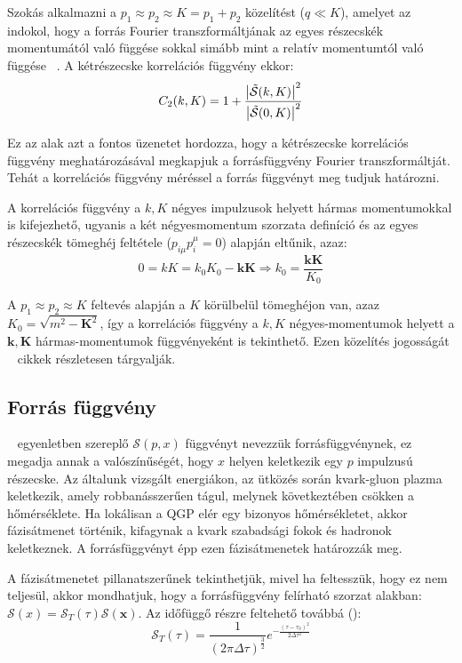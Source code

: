 \documentclass[11pt,a4paper]{article}
\numberwithin{equation}{subsection}
\numberwithin{figure}{section}
\begin{document}
Szokás alkalmazni a ${p_1}\approx {p_2}\approx {K} = p_1+p_2$ közelítést ($q\ll K$), amelyet az indokol, hogy a forrás Fourier transzformáltjának az egyes részecskék momentumától való függése sokkal simább mint a relatív momentumtól való függése ~\cite{Lisa:2005dd}. A kétrészecske korrelációs függvény ekkor: 
\begin{equation}
C_2({k}, {K})=1+\frac{\abs{\tilde{\mathcal{S}}({k},{K})}^2}{\abs{\tilde{\mathcal{S}}(0,{K})}^2}
\label{eq:C02}
\end{equation}

Ez az alak azt a fontos üzenetet hordozza, hogy a kétrészecske korrelációs függvény meghatározásával megkapjuk a forrásfüggvény Fourier transzformáltját. Tehát a korrelációs függvény méréssel a forrás függvényt meg tudjuk határozni. 


A korrelációs függvény a $k,K$ négyes impulzusok helyett hármas momentumokkal is kifejezhető, ugyanis a két négyesmomentum szorzata definíció és az egyes részecskék tömeghéj feltétele ($p_{i\mu}p^{\mu}_i=0$) alapján eltűnik, azaz:
\begin{equation}
0=kK=k_0K_0-\bm{kK}\Rightarrow k_0 = \frac{\bm{kK}}{K_0}
\label{eq:kK}
\end{equation}

A $p_1\approx p_2\approx K$ feltevés alapján a $K$ körülbelül tömeghéjon van, azaz $K_0 = \sqrt{m^2-\bm{K}^2}$, így a korrelációs függvény a $k,K$ négyes-momentumok helyett a $\bm{k},\bm{K}$ hármas-momentumok függvényeként is tekinthető. Ezen közelítés jogosságát ~\cite{Wiedemann:1999qn, Csorgo:1999sj} cikkek részletesen tárgyalják.

\subsection{Forrás függvény}
~ egyenletben szereplő $\mathcal{S}({p},{x})$ függvényt nevezzük forrásfüggvénynek, ez megadja annak a valószínűségét, hogy ${x}$ helyen keletkezik egy ${p}$ impulzusú részecske. Az általunk vizsgált energiákon, az ütközés során kvark-gluon plazma keletkezik, amely robbanásszerűen tágul, melynek következtében csökken a hőmérséklete. Ha lokálisan a QGP elér egy bizonyos hőmérsékletet, akkor fázisátmenet történik, kifagynak a kvark szabadsági fokok és hadronok keletkeznek. A forrásfüggvényt épp ezen fázisátmenetek határozzák meg. 

A fázisátmenetet pillanatszerűnek tekinthetjük, mivel ha feltesszük, hogy ez nem teljesül, akkor mondhatjuk, hogy a forrásfüggvény felírható szorzat alakban: $\mathcal{S}({x}) = \mathcal{S}_T(\tau)\mathcal{S}(\bm{x})$. Az időfüggő részre feltehető továbbá (\cite{CsanadHabil}):
\begin{equation}
\mathcal{S}_T(\tau)=\frac{1}{(2\pi \Delta\tau)^\frac{3}{2}}e^{-\frac{(\tau-\tau_0)^2}{2\Delta\tau^2}}
\end{equation}
\end{document}
